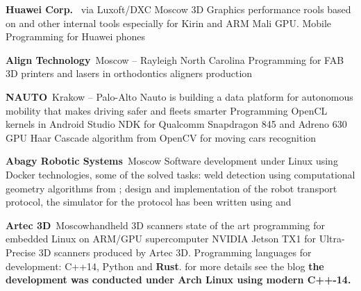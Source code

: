 \documentclass[11pt,a4paper,roman]{moderncv}
\begin{document}
    {{\bfseries{Huawei Corp.}}\  via Luxoft/DXC }{Moscow}{}{
        3D Graphics performance rools based on  and other internal tools especially for Kirin and ARM Mali GPU. Mobile Programming for Huawei phones
}

  {{\bfseries{Align Technology}}\  }{Moscow -- Rayleigh North Carolina}{} {
  Programming for FAB 3D printers and lasers in orthodontics aligners production
}

  {{\bfseries{NAUTO}}\  }{Krakow -- Palo-Alto}
  {Nauto is building a data platform for autonomous mobility that makes driving safer and fleets smarter} {
  Programming OpenCL kernels in Android Studio NDK for Qualcomm Snapdragon 845 and Adreno 630 GPU
  Haar Cascade algorithm from OpenCV for moving cars recognition
}

  {{\bfseries{Abagy Robotic Systems}}\  }{Moscow}{} {
  Software development under Linux using Docker technologies, some of the solved tasks: weld detection using computational geometry algorithms from
  ; design and implementation of the robot transport protocol, the simulator for the protocol has been written using  and 
}

    {{\bfseries{Artec 3D}}\  }{Moscow}{handheld 3D scanners} {
        state of the art programming for embedded Linux on ARM/GPU supercomputer NVIDIA Jetson TX1 for Ultra-Precise 3D scanners produced by Artec 3D. Programming languages for development: C++14, Python and \textbf{Rust}.
  for more details see the blog  \bfseries{the development was conducted under Arch Linux using modern C++-14}.
}
\end{document}
